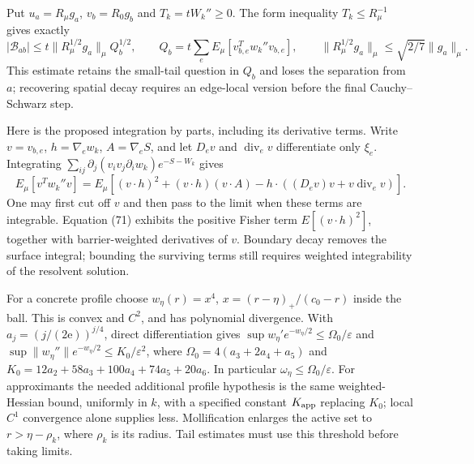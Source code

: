 \documentclass[11pt,a4paper]{article}
\begin{document}
Put \(u_a=R_\mu g_a\), \(v_b=R_0g_b\) and \(T_k=tW_k''\ge0\). The form
inequality \(T_k\le R_\mu^{-1}\) gives exactly
\[|\mathcal B_{ab}|\le t\|R_\mu^{1/2}g_a\|_\mu Q_b^{1/2},\qquad
Q_b=t\sum_e E_\mu[v_{b,e}^{T}w_k''v_{b,e}],\qquad
\|R_\mu^{1/2}g_a\|_\mu\le\sqrt{2/7}\|g_a\|_\mu.\tag{70}\] This estimate
retains the small-tail question in \(Q_b\) and loses the separation from
\(a\); recovering spatial decay requires an edge-local version before
the final Cauchy--Schwarz step.

Here is the proposed integration by parts, including its derivative
terms. Write \(v=v_{b,e}\), \(h=\nabla_e w_k\), \(A=\nabla_eS\), and let
\(D_ev\) and \(\operatorname{div}_ev\) differentiate only \(\xi_e\).
Integrating \(\sum_{ij}\partial_j(v_iv_j\partial_iw_k)e^{-S-W_k}\) gives
\[E_\mu[v^Tw_k''v]=E_\mu[(v\cdot h)^2+(v\cdot h)(v\cdot A)
-h\cdot((D_ev)v+v\operatorname{div}_ev)].\tag{71}\] One may first cut
off \(v\) and then pass to the limit when these terms are integrable.
Equation (71) exhibits the positive Fisher term \(E[(v\cdot h)^2]\),
together with barrier-weighted derivatives of \(v\). Boundary decay
removes the surface integral; bounding the surviving terms still
requires weighted integrability of the resolvent solution.

For a concrete profile choose \(w_\eta(r)=x^4\),
\(x=(r-\eta)_+/(c_0-r)\) inside the ball. This is convex and \(C^2\),
and has polynomial divergence. With \(a_j=(j/(2\mathrm e))^{j/4}\),
direct differentiation gives
\(\sup w_\eta'e^{-w_\eta/2}\le\Omega_0/\varepsilon\) and
\(\sup\|w_\eta''\|e^{-w_\eta/2}\le K_0/\varepsilon^2\), where
\(\Omega_0=4(a_3+2a_4+a_5)\) and \(K_0=12a_2+58a_3+100a_4+74a_5+20a_6\).
In particular \(\omega_\eta\le\Omega_0/\varepsilon\). For approximants
the needed additional profile hypothesis is the same weighted-Hessian
bound, uniformly in \(k\), with a specified constant \(K_{\rm app}\)
replacing \(K_0\); local \(C^1\) convergence alone supplies less.
Mollification enlarges the active set to \(r>\eta-\rho_k\), where
\(\rho_k\) is its radius. Tail estimates must use this threshold before
taking limits.
\end{document}
